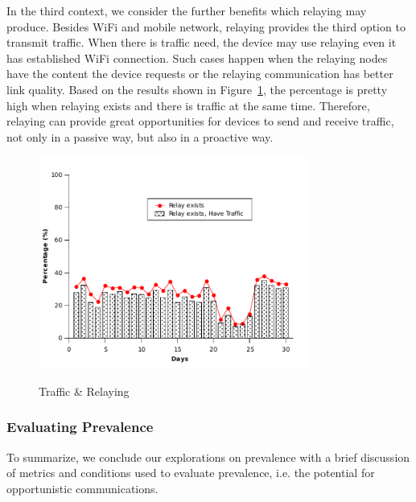 In the third context, we consider the further benefits which relaying may produce. Besides WiFi and mobile network, relaying provides the third option to transmit traffic. When there is traffic need, the device may use relaying even it has established WiFi connection. Such cases happen when the relaying nodes have the content the device requests or the relaying communication has better link quality. Based on the results shown in Figure~\ref{fig:relay_traffic}, the percentage is pretty high when relaying exists and there is traffic at the same time. Therefore, relaying can provide great opportunities for devices to send and receive traffic, not only in a passive way, but also in a proactive way. 

\begin{figure}[tbp]
\centering 
{\includegraphics[width=3.5in]{graphs/relay_traffic.pdf}}
\caption{Traffic \& Relaying} 
\label{fig:relay_traffic}
\end{figure}

\subsubsection{Evaluating Prevalence} 

To summarize, we conclude our explorations on prevalence with a brief discussion of metrics and conditions used to evaluate prevalence, i.e. the potential for opportunistic communications.  

